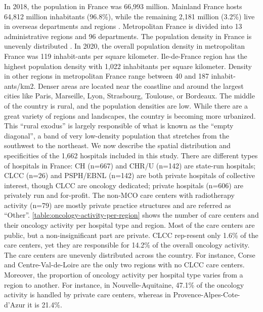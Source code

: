 In 2018, the population in France was 66,993 million. Mainland France hosts 64,812 million inhabitants (96.8\%), while the remaining 2,181 million (3.2\%) live in overseas departments and regions . Metropolitan France is divided into 13 administrative regions and 96 departments. The population density in France is unevenly distributed . In 2020, the overall population density in metropolitan France was 119 inhabit-ants per square kilometer. Ile-de-France region has the highest population density with 1,022 inhabitants per square kilometer. Density in other regions in metropolitan France range between 40 and 187 inhabit-ants/km2. Denser areas are located near the coastline and around the largest cities like Paris, Marseille, Lyon, Strasbourg, Toulouse, or Bordeaux. The middle of the country is rural, and the population densities are low. While there are a great variety of regions and landscapes, the country is becoming more urbanized. This ``rural exodus'' is largely responsible of what is known as the ``empty diagonal'', a band of very low-density population that stretches from the southwest to the northeast.
We now describe the spatial distribution and specificities of the 1,662 hospitals included in this study. There are different types of hospitals in France: CH  (n=667) and CHR/U  (n=142) are state-run hospitals; CLCC  (n=26) and PSPH/EBNL  (n=142) are both private hospitals of collective interest, though CLCC are oncology dedicated; private hospitals (n=606) are privately run and for-profit. The non-MCO care centers with radiotherapy activity (n=79) are mostly private practice structures and are referred as “Other”. \cref{table:oncology-activity-per-region} shows the number of care centers and their oncology activity per hospital type and region. Most of the care centers are public, but a non-insignificant part are private. CLCC rep-resent only 1.6\% of the care centers, yet they are responsible for 14.2\% of the overall oncology activity. The care centers are unevenly distributed across the country. For instance, Corse and Centre-Val-de-Loire are the only two regions with no CLCC care centers. Moreover, the proportion of oncology activity per hospital type varies from a region to another. For instance, in Nouvelle-Aquitaine, 47.1\% of the oncology activity is handled by private care centers, whereas in Provence-Alpes-Cote-d'Azur it is 21.4\%.

